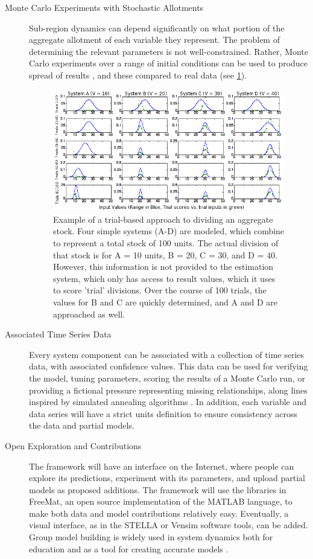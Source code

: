 \documentclass[12pt, oneside]{amsart}
\begin{document}
\begin{description}
\item[Monte Carlo Experiments with Stochastic Allotments] Sub-region dynamics can depend significantly on what portion of the aggregate allotment of each variable they represent.  The problem of determining the relevant parameters is not well-constrained.  Rather, Monte Carlo experiments over a range of initial conditions can be used to produce spread of results \citep{liu1998sequential}, and these compared to real data (see \ref{fig:trialestimate}).
\begin{figure}[htb]
\includegraphics[width=6in]{trialestimate.png}
\caption{Example of a trial-based approach to dividing an aggregate stock.  Four simple systems (A-D) are modeled, which combine to represent a total stock of 100 units.  The actual division of that stock is for A = 10 units, B = 20, C = 30, and D = 40.  However, this information is not provided to the estimation system, which only has access to result values, which it uses to score 'trial' divisions.  Over the course of 100 trials, the values for B and C are quickly determined, and A and D are approached as well.}
\label{fig:trialestimate}
\end{figure}

\item[Associated Time Series Data] Every system component can be associated with a collection of time series data, with associated confidence values.  This data can be used for verifying the model, tuning parameters, scoring the results of a Monte Carlo run, or providing a fictional pressure representing missing relationships, along lines inspired by simulated annealing algorithms \citep{corana1987minimizing}.  In addition, each variable and data series will have a strict units definition to ensure consistency across the data and partial models.

\item[Open Exploration and Contributions] The framework will have an interface on the Internet, where people can explore its predictions, experiment with its parameters, and upload partial models as proposed additions.  The framework will use the libraries in FreeMat, an open source implementation of the MATLAB language, to make both data and model contributions relatively easy.  Eventually, a visual interface, as in the STELLA or Vensim software tools, can be added.  Group model building is widely used in system dynamics both for education and as a tool for creating accurate models \citep{rouwette2002group}.


\end{description}
\end{document}
